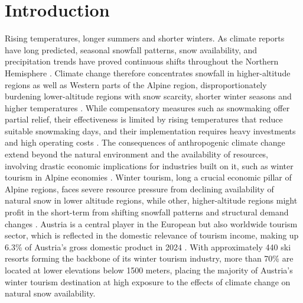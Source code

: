 \documentclass{article}
\begin{document}
\section{Introduction}
Rising temperatures, longer summers and shorter winters. As climate reports have long predicted, seasonal snowfall patterns, snow availability, and precipitation trends have proved continuous shifts throughout the Northern Hemisphere \parencite{li2025, Olefs2020, oecd2007}. Climate change therefore concentrates snowfall in higher-altitude regions as well as Western parts of the Alpine region, disproportionately burdening lower-altitude regions with snow scarcity, shorter winter seasons and higher temperatures \parencite{li2025, Steiger2013}. While compensatory measures such as snowmaking offer partial relief, their effectiveness is limited by rising temperatures that reduce suitable snowmaking days, and their implementation requires heavy investments and high operating costs \parencite{Steiger2013, copernicus2018}. The consequences of anthropogenic climate change extend beyond the natural environment and the availability of resources, involving drastic economic implications for industries built on it, such as winter tourism in Alpine economies \parencite{lealfilho2024}.
Winter tourism, long a crucial economic pillar of Alpine regions, faces severe resource pressure from declining availability of natural snow in lower altitude regions, while other, higher-altitude regions might profit in the short-term from shifting snowfall patterns and structural demand changes \parencite{oecd2007, lealfilho2024}. Austria is a central player in the European but also worldwide tourism sector, which is reflected in the domestic relevance of tourism income, making up 6.3\% of Austria's gross domestic product in 2024 \parencite{fritz2025}. With approximately 440 ski resorts forming the backbone of its winter tourism industry, more than 70\% are located at lower elevations below 1500 meters, placing the majority of Austria's winter tourism destination at high exposure to the effects of climate change on natural snow availability. 
\end{document}
